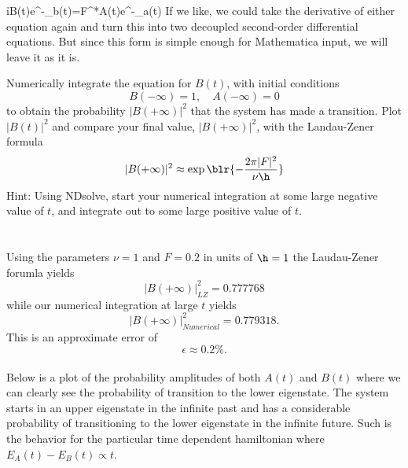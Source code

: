 \documentclass[10pt,letterpaper]{article}
\begin{document}
		\be\label{8}
			i\h\dot B(t)e^{-\theta_b(t)}=F^*A(t)e^{-\theta_a(t)} 
		\ee
		If we like, we could take the derivative of either equation again and turn this into two decoupled
		second-order differential equations. But since this form is simple enough for Mathematica input, we 
		will leave it as it is. 
		\\
		\item
		Numerically integrate the equation for $B(t)$, with initial conditions
		\[
			B(-\infty)=1,\quad A(-\infty) = 0
		\]
		to obtain the probability $|B(+\infty)|^2$ that the system has made a transition. Plot $|B(t)|^2$ 
		and compare your final value, $|B(+\infty)|^2$, with the Landau-Zener formula
		\[	
			|B(+\infty)|^2 \approx \exp\blr{-\frac{2\pi|F|^2}{\nu\h}}
		\]
		Hint: Using NDsolve, start your numerical integration at some large negative value of $t$, and integrate
		out to some large positive value of $t$.
		\\
		\\
		\\
		Using the parameters $\nu = 1$ and $F = 0.2$ in units of $\h=1$ the Laudau-Zener forumla yields
		\[
			|B(+\infty)|^2_{LZ} = 0.777768
		\]
		while our numerical integration at large $t$ yields
		\[
			|B(+\infty)|^2_{Numerical} = 0.779318.
		\]
		This is an approximate error of
		\[
			\epsilon \approx 0.2 \%.
		\]
		\\
		Below is a plot of the probability amplitudes of both $A(t)$ and $B(t)$ where we can clearly see the probability of
		transition to the lower eigenstate. The system starts in an upper eigenstate in the infinite past and has a 
		considerable probability of transitioning to the lower eigenstate in the infinite future. Such is the
		behavior for the particular time dependent hamiltonian where $E_A(t)-E_B(t) \propto t$. 
		
		
		\eenum
	
	
\eenum
\end{document}
